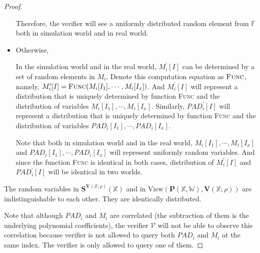 \begin{proof}
\begin{itemize}
    Therefore, the verifier will see a uniformly distributed random element from $\mathbb{F}$ both in simulation world and in real world.
    
    \item Otherwise,
    
    In the simulation world and in the real world, $M_i^\prime[I]$ can be determined by a set of random elements in $M_i$. Denote this computation equation as $\textsc{Func}$, namely, $M_i^\prime[I] = \textsc{Func}(M_i[I_1], \cdots, M_i[I_x])$. And $M_i^\prime[I]$ will represent a distribution that is uniquely determined by function \textsc{Func} and the distribution of variables $M_i[I_1], \cdots, M_i[I_x]$. Similarly, $PAD_i^\prime[I]$ will represent a distribution that is uniquely determined by function \textsc{Func} and the distribution of variables $PAD_i[I_1], \cdots, PAD_i[I_x]$.
    
    Note that both in simulation world and in the real world, $M_i[I_1], \cdots, M_i[I_x]$ and $PAD_i[I_1], \cdots, PAD_i[I_x]$ will represent uniformly random variables. And since the function \textsc{Func} is identical in both cases, distribution of $M_i^\prime[I]$ and $PAD_i^\prime[I]$ will be identical in two worlds.
    
    
\end{itemize}



The random variables in $\textbf{S}^{\textbf{V}(\mathbb{X};\rho)}(\mathbb{X})$ and in $\text{View}(\textbf{P}(\mathbb{X}, \mathbb{W}), \textbf{V}(\mathbb{X};\rho))$ are indistinguishable to each other. They are identically distributed.

Note that although $PAD_i$ and $M_i$ are correlated (the subtraction of them is the underlying polynomial coefficients), the verifier $\mathcal{V}$ will not be able to observe this correlation because verifier is not allowed to query both $PAD_i$ and $M_i$ at the same index. The verifier is only allowed to query one of them.

\end{proof}